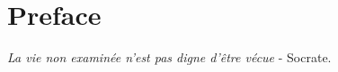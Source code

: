 \thispagestyle{empty}
\cleardoublepage 
\thispagestyle{preface}
\section*{Preface}
			\emph{La vie non examinée n'est pas digne d'être vécue }- Socrate.


	 